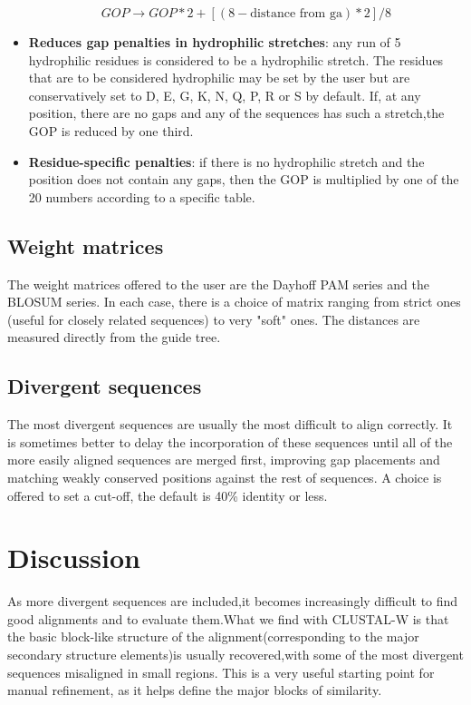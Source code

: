 \begin{itemize}
$$GOP  \rightarrow GOP*{2+[(8-\text{distance from ga})*2]/8}$$
\item \textbf{Reduces gap penalties in hydrophilic stretches}: any run of 5 hydrophilic residues is considered to be a hydrophilic stretch. The residues that are to be considered hydrophilic may be set by the user but are conservatively set to D, E, G, K, N, Q, P, R or S by default. If, at any position, there are no gaps and any of the sequences has such a stretch,the GOP is reduced by one third.
\item \textbf{Residue-specific penalties}: if there is no hydrophilic stretch and the position does not contain any gaps, then the GOP is multiplied by one of the 20 numbers according to a specific table.
\end{itemize}

\subsection{Weight matrices}
The weight matrices offered to the user are the Dayhoff PAM series and the BLOSUM series. In each case, there is a choice of matrix ranging from strict ones (useful for closely related sequences) to very "soft" ones. The distances are measured directly from the guide tree.

\subsection{Divergent sequences}
The most divergent sequences are usually the most difficult to align correctly.  It is sometimes better to delay the incorporation of these sequences until all of the more easily aligned sequences are merged first, improving gap placements and matching weakly conserved positions against the rest of sequences.  A choice is offered to set a cut-off, the default is 40\% identity or less.

\section{Discussion}
As more divergent sequences are included,it becomes increasingly difficult to find good alignments and to evaluate them.What we find with CLUSTAL-W is that the basic block-like structure of the alignment(corresponding to the major  secondary structure elements)is usually recovered,with some of the most divergent sequences  misaligned in small  regions. This is a very useful starting point for manual refinement, as it helps define the major blocks of similarity.

